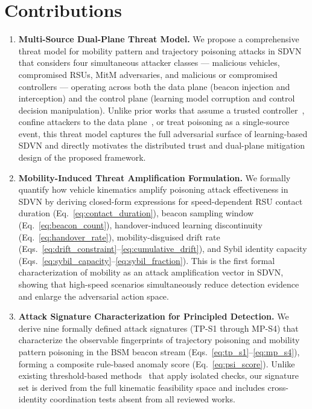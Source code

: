 \documentclass[12pt, a4paper]{report}
\begin{document}
\section{Contributions}

\begin{enumerate}
\item \textbf{Multi-Source Dual-Plane Threat Model.}
We propose a comprehensive threat model for mobility pattern and trajectory
poisoning attacks in SDVN that considers four simultaneous attacker classes
--- malicious vehicles, compromised RSUs, MitM adversaries, and malicious
or compromised controllers --- operating across both the data plane (beacon
injection and interception) and the control plane (learning model corruption
and control decision manipulation). Unlike prior works that assume a trusted
controller~\cite{raja2021, ghaleb2014}, confine attackers to
the data plane~\cite{hong2015}, or treat poisoning as a
single-source event, this threat model captures the full adversarial
surface of learning-based SDVN and directly motivates the distributed
trust and dual-plane mitigation design of the proposed framework.

\item \textbf{Mobility-Induced Threat Amplification Formulation.}
We formally quantify how vehicle kinematics amplify poisoning attack
effectiveness in SDVN by deriving closed-form expressions for
speed-dependent RSU contact duration (Eq.~\eqref{eq:contact_duration}),
beacon sampling window (Eq.~\eqref{eq:beacon_count}), handover-induced
learning discontinuity (Eq.~\eqref{eq:handover_rate}), mobility-disguised
drift rate (Eqs.~\eqref{eq:drift_constraint}--\eqref{eq:cumulative_drift}),
and Sybil identity capacity (Eqs.~\eqref{eq:sybil_capacity}--\eqref{eq:sybil_fraction}).
This is the first formal characterization of mobility as an attack
amplification vector in SDVN, showing that high-speed scenarios
simultaneously reduce detection evidence and enlarge the adversarial
action space.

\item \textbf{Attack Signature Characterization for Principled Detection.}
We derive nine formally defined attack signatures
(TP-S1 through MP-S4) that characterize the observable fingerprints of
trajectory poisoning and mobility pattern poisoning in the BSM beacon
stream (Eqs.~\eqref{eq:tp_s1}--\eqref{eq:mp_s4}), forming a composite
rule-based anomaly score (Eq.~\eqref{eq:psi_score}). Unlike existing
threshold-based methods~\cite{ghaleb2014} that apply isolated
checks, our signature set is derived from the full kinematic feasibility
space and includes cross-identity coordination tests absent from all
reviewed works.


\end{enumerate}
\end{document}
